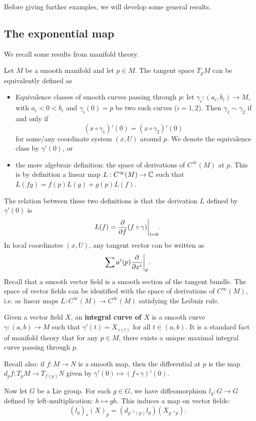 \documentclass[11pt, english]{article}
\begin{document}
Before giving further examples, we will develop some general results.

\subsection{The exponential map}

We recall some results from manifold theory.

Let $M$ be a smooth manifold and let $p \in M$. The tangent space $T_pM$ can be equivalently defined as
\begin{itemize}
\item Equivalence classes of smooth curves passing through $p$: let $\gamma_i:(a_i,b_i) \to M$, with $a_i < 0 < b_i$ and $\gamma_i(0)=p$ be two such curves ($i=1,2$). Then $\gamma_1 \sim \gamma_2$ if and only if 
$$
(x \circ \gamma_1)'(0) = (x \circ \gamma_2)'(0)
$$
for some/any coordinate system $(x,U)$ around $p$. We denote the equivalence class by $\gamma'(0)$, or
\item the more algebraic definition: the space of derivations of $C^\infty (M)$ at $p$. This is by definition a linear map $L:C^\infty(M) \to \mathbb{C}$ such that $L(fg) = f(p)L(g) + g(p)L(f)$.
\end{itemize}
The relation between these two definitions is that the derivation $L$ defined by $\gamma'(0)$ is
$$
L(f) = \restr{\dd{}{f}(f \circ \gamma)}{t=0}.
$$
In local coordinates $(x,U)$, any tangent vector can be written as
$$
\sum a^i(p) \restr{\dd{}{x^i}}{p}.
$$
Recall that a smooth vector field is a smooth section of the tangent bundle. The space of vector fields can be identified with the space of derivations of $C^\infty(M)$, i.e. as linear maps $L:C^\infty(M) \to C^\infty(M)$ satisfying the Leibniz rule.

Given a vector field $X$, an \textbf{integral curve of $X$} is a smooth curve $\gamma:(a,b) \to M$ such that $\gamma'(t) = X_{\gamma(t)}$ for all $t \in (a,b)$. It is a standard fact of manifold theory that for any $p \in M$, there exists a unique maximal integral curve passing through $p$. 

Recall also: if $f:M \to N$ is a smooth map, then the differential at $p$ is the map  $d_pf:T_pM \to T_{f(p)}N$ given by $\gamma'(0) \mapsto (f \circ \gamma)'(0)$. 

Now let $G$ be a Lie group. For each $g \in G$, we have diffeomorphism $l_g:G \to G$ defined by left-multiplication: $h \mapsto gh$. This induces a map on vector fields:
$$
(l_g)_\ast(X)_p = (d_{g^{-1}(p)} l_g)(X_{g^{-1}p}).
$$
\end{document}
